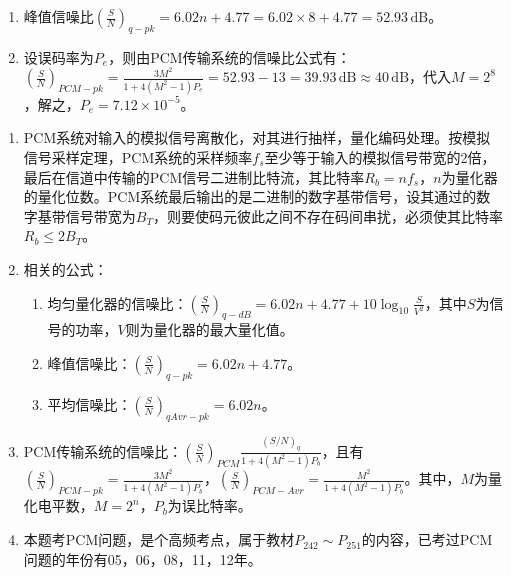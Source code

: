 {\begin{enumerate}
  设传输该PCM信号所需最小带宽为$B_T$，则由$R_b=2B_T$得$B_T=\frac{1}{2}R_b=32\,\mathrm{kHz}$。
  \item 峰值信噪比$\left(\frac{S}{N}\right)_{q-pk}=6.02n+4.77=6.02\times8+4.77=52.93\,\mathrm{dB}$。
  \item 设误码率为$P_e$，则由PCM传输系统的信噪比公式有：$\left(\frac{S}{N}\right)_{PCM-pk}=\frac{3M^2}{1+4(M^2-1)P_e}=52.93-13=39.93\,\mathrm{dB}\approx 40\,\mathrm{dB}$，代入$M=2^8$，解之，$P_e=7.12\times10^{-5}$。
\end{enumerate}
\begin{parchment}[综述]
  \begin{enumerate}
    \item PCM系统对输入的模拟信号离散化，对其进行抽样，量化编码处理。按模拟信号采样定理，PCM系统的采样频率$f_s$至少等于输入的模拟信号带宽的2倍，最后在信道中传输的PCM信号二进制比特流，其比特率$R_b=nf_s$，$n$为量化器的量化位数。PCM系统最后输出的是二进制的数字基带信号，设其通过的数字基带信号带宽为$B_T$，则要使码元彼此之间不存在码间串扰，必须使其比特率$R_b\leqslant 2B_T$。
    \item 相关的公式：
    \begin{enumerate}
      \item 均匀量化器的信噪比：$\left(\frac{S}{N}\right)_{q-dB}=6.02n+4.77+10\log_{10}\frac{S}{V^2}$，其中$S$为信号的功率，$V$则为量化器的最大量化值。
      \item 峰值信噪比：$\left(\frac{S}{N}\right)_{q-pk}=6.02n+4.77$。
      \item 平均信噪比：$\left(\frac{S}{N}\right)_{qAvr-pk}=6.02n$。
    \end{enumerate}
    \item PCM传输系统的信噪比：$\left(\frac{S}{N}\right)_{PCM}\frac{(S/N)_q}{1+4(M^2-1)P_b}$，且有$\left(\frac{S}{N}\right)_{PCM-pk}=\frac{3M^2}{1+4(M^2-1)P_b}$，$\left(\frac{S}{N}\right)_{PCM-Avr}=\frac{M^2}{1+4(M^2-1)P_b}$。其中，$M$为量化电平数，$M=2^n$，$P_b$为误比特率。
    \item 本题考PCM问题，是个高频考点，属于教材$P_{242}\sim P_{251}$的内容，已考过PCM问题的年份有05，06，08，11，12年。
  \end{enumerate}
\end{parchment}}

